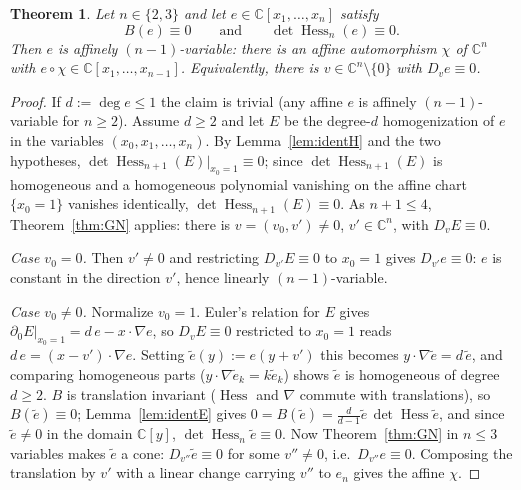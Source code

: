 \documentclass[11pt]{article}
\theoremstyle{plain}
\newtheorem{theorem}{Theorem}[section]
\theoremstyle{definition}
\newcommand{\C}{\mathbb{C}}
\newcommand{\Hess}{\operatorname{Hess}}
\begin{document}
\begin{theorem}\label{thm:F}
Let $n\in\{2,3\}$ and let $e\in\C[x_1,\dots,x_n]$ satisfy
\[
B(e)\equiv0\qquad\text{and}\qquad\det\Hess_n(e)\equiv0 .
\]
Then $e$ is affinely $(n-1)$-variable: there is an affine automorphism
$\chi$ of $\C^n$ with $e\circ\chi\in\C[x_1,\dots,x_{n-1}]$. Equivalently,
there is $v\in\C^n\setminus\{0\}$ with $D_ve\equiv0$.
\end{theorem}

\begin{proof}
If $d:=\deg e\le1$ the claim is trivial (any affine $e$ is affinely
$(n-1)$-variable for $n\ge2$). Assume $d\ge2$ and let $E$ be the
degree-$d$ homogenization of $e$ in the variables $(x_0,x_1,\dots,x_n)$.
By Lemma~\ref{lem:identH} and the two hypotheses,
$\det\Hess_{n+1}(E)|_{x_0=1}\equiv0$; since $\det\Hess_{n+1}(E)$ is
homogeneous and a homogeneous polynomial vanishing on the affine chart
$\{x_0=1\}$ vanishes identically, $\det\Hess_{n+1}(E)\equiv0$. As
$n+1\le4$, Theorem~\ref{thm:GN} applies: there is
$v=(v_0,v')\ne0$, $v'\in\C^n$, with $D_vE\equiv0$.

\emph{Case $v_0=0$.} Then $v'\ne0$ and restricting $D_{v'}E\equiv0$ to
$x_0=1$ gives $D_{v'}e\equiv0$: $e$ is constant in the direction $v'$,
hence linearly $(n-1)$-variable.

\emph{Case $v_0\ne0$.} Normalize $v_0=1$. Euler's relation for $E$ gives
$\partial_0E|_{x_0=1}=d\,e-x\!\cdot\!\nabla e$, so $D_vE\equiv0$ restricted
to $x_0=1$ reads $d\,e=(x-v')\!\cdot\!\nabla e$. Setting
$\tilde e(y):=e(y+v')$ this becomes $y\!\cdot\!\nabla\tilde e=d\,\tilde e$,
and comparing homogeneous parts ($y\!\cdot\!\nabla\tilde e_k=k\tilde e_k$)
shows $\tilde e$ is homogeneous of degree $d\ge2$. $B$ is translation
invariant ($\Hess$ and $\nabla$ commute with translations), so
$B(\tilde e)\equiv0$; Lemma~\ref{lem:identE} gives
$0=B(\tilde e)=\tfrac{d}{d-1}\tilde e\,\det\Hess\tilde e$, and since
$\tilde e\ne0$ in the domain $\C[y]$, $\det\Hess_n\tilde e\equiv0$. Now
Theorem~\ref{thm:GN} in $n\le3$ variables makes $\tilde e$ a cone:
$D_{v''}\tilde e\equiv0$ for some $v''\ne0$, i.e.\ $D_{v''}e\equiv0$.
Composing the translation by $v'$ with a linear change carrying $v''$ to
$e_n$ gives the affine $\chi$.
\end{proof}
\end{document}
